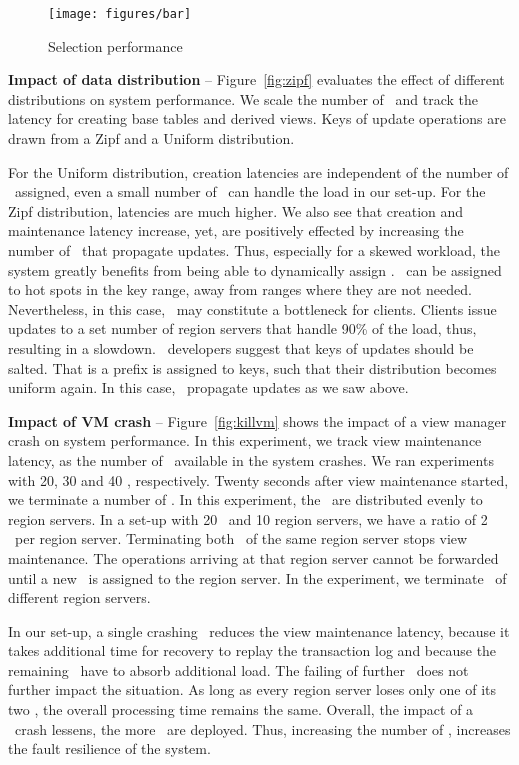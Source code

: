 \begin{figure}
  \texttt{[image: figures/bar]}
      \vspace{-3mm}
  \caption{Selection performance}\label{fig:staleness}
        \vspace{-1mm}
\end{figure}

\noindent
{\bf Impact of data distribution} -- Figure~\ref{fig:zipf} evaluates
the effect of different distributions on system performance.  We scale
the number of \VMs\ and track the latency for creating base tables and
derived views.  Keys of update operations are drawn from a Zipf and a
Uniform distribution.

For the Uniform distribution, creation latencies are independent of
the number of \VMs\ assigned, even a small number of \VMs\ can handle the
load in our set-up.  For the Zipf distribution, latencies are much
higher. We also see that creation and maintenance latency increase,
yet, are positively effected by increasing the number of \VMs\ that
propagate updates.  Thus, especially for a skewed workload, the system
greatly benefits from being able to dynamically assign \VMs.  \VMs\ can
be assigned to hot spots in the key range, away from ranges where they
are not needed.  Nevertheless, in this case, \HB\ may constitute a
bottleneck for clients. Clients issue updates to a set number of
region servers that handle 90\% of the load, thus, resulting in a
slowdown.  \HB\ developers suggest that keys of updates should be
salted. That is a prefix is assigned to keys, such that their
distribution becomes uniform again. In this case, \VMs\ propagate
updates as we saw above.

\noindent
{\bf Impact of VM crash} -- Figure~\ref{fig:killvm} shows the impact
of a view manager crash on system performance.  In this experiment, we
track view maintenance latency, as the number of \VMs\ available in the
system crashes.  We ran experiments with 20, 30 and 40 \VMs,
respectively. Twenty seconds after view maintenance started, we
terminate a number of \VMs. In this experiment, the \VMs\ are distributed
evenly to region servers. In a set-up with 20 \VMs\ and 10 region
servers, we have a ratio of 2 \VMs\ per region server. Terminating both
\VMs\ of the same region server stops view maintenance. The operations
arriving at that region server cannot be forwarded until a new \VM\ is
assigned to the region server. In the experiment, we terminate \VMs\ of
different region servers.

In our set-up, a single crashing \VM\ reduces the view maintenance
latency, because it takes additional time for recovery to replay the
transaction log and because the remaining \VMs\ have to absorb
additional load.  The failing of further \VMs\ does not further impact
the situation.  As long as every region server loses only one of its
two \VMs, the overall processing time remains the same.  Overall, the
impact of a \VM\ crash lessens, the more \VMs\ are deployed.  Thus,
increasing the number of \VMs, increases the fault resilience of the
system.

